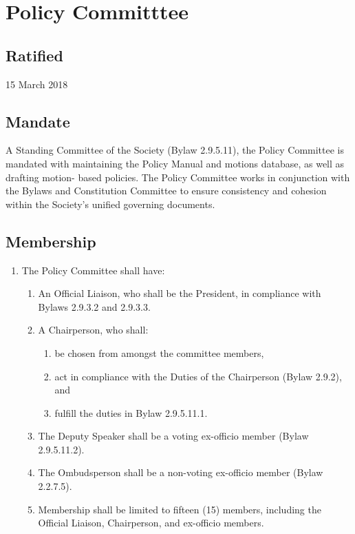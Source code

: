 \section{Policy Committtee}
\subsection{Ratified}
15 March 2018
\subsection{Mandate}
A Standing Committee of the Society (Bylaw 2.9.5.11), the Policy Committee is mandated with maintaining the Policy Manual and motions database, as well as drafting motion- based policies. The Policy Committee works in conjunction with the Bylaws and Constitution Committee to ensure consistency and cohesion within the Society's unified governing documents.
\subsection{Membership}
\begin{enumerate}[label*=\arabic*., align=left]	
\item The Policy Committee shall have:
\begin{enumerate}[label*=\arabic*., align=left]	
\item An Official Liaison, who shall be the President, in compliance with Bylaws 2.9.3.2 and
2.9.3.3.
\item A Chairperson, who shall:
\begin{enumerate}
\item be chosen from amongst the committee members,
\item act in compliance with the Duties of the Chairperson (Bylaw 2.9.2), and
\item fulfill the duties in Bylaw 2.9.5.11.1.
\end{enumerate}
\item The Deputy Speaker shall be a voting ex-officio member (Bylaw 2.9.5.11.2).
\item The Ombudsperson shall be a non-voting ex-officio member (Bylaw 2.2.7.5).
\item Membership shall be limited to fifteen (15) members, including the Official Liaison,
Chairperson, and ex-officio members.
\end{enumerate}
\end{enumerate}

